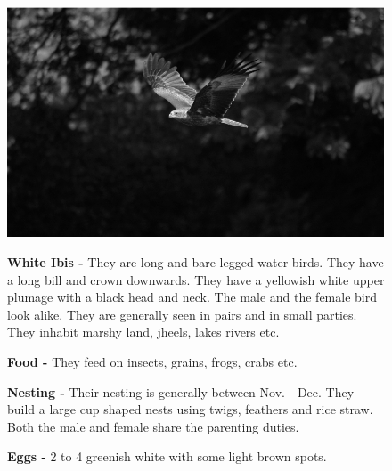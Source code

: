 \begin{figure}[H]
\begin{center}
\includegraphics{figure/Land_birds/01_pariah_kite/pariah-kite.eps}
\end{center}
\medskip
\noindent
{\bf White Ibis -} They are long and bare legged water birds. They have a long bill and crown downwards. They have a yellowish white upper plumage with a black head and neck. The male and the female bird look alike. They are generally seen in pairs and in small parties. They inhabit marshy land, jheels, lakes rivers etc.

\medskip
{\bf Food -} They feed on insects, grains, frogs, crabs etc.

{\bf Nesting -} Their nesting is generally between Nov. - Dec. They build a large cup shaped nests using twigs, feathers and rice straw. Both the male and female share the parenting duties. 

{\bf Eggs -} 2 to 4 greenish white with some light brown spots.
\end{figure}

\vfill\eject

~\phantom{a}
\vfill

